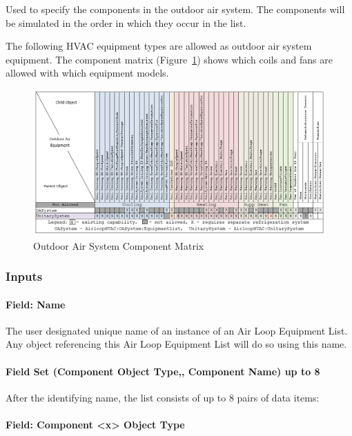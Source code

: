Used to specify the components in the outdoor air system. The components will be simulated in the order in which they occur in the list.

The following HVAC equipment types are allowed as outdoor air system equipment. The component matrix (Figure~\ref{fig:outdoor-air-system-component-matrix}) shows which coils and fans are allowed with which equipment models.

\begin{figure}[htbp]
\centering
\includegraphics{media/OASysComponentMatrix.png}
\caption{Outdoor Air System Component Matrix \protect \label{fig:outdoor-air-system-component-matrix}}
\end{figure}

\subsubsection{Inputs}\label{inputs-4-001}

\paragraph{Field: Name}\label{field-name-4-001}

The user designated unique name of an instance of an Air Loop Equipment List. Any object referencing this Air Loop Equipment List will do so using this name.

\paragraph{Field Set (Component Object Type,, Component Name) up to 8}\label{field-set-component-object-type-component-name-up-to-8}

After the identifying name, the list consists of up to 8 pairs of data items:

\paragraph{Field: Component \textless{}x\textgreater{} Object Type}\label{field-component-x-object-type}

